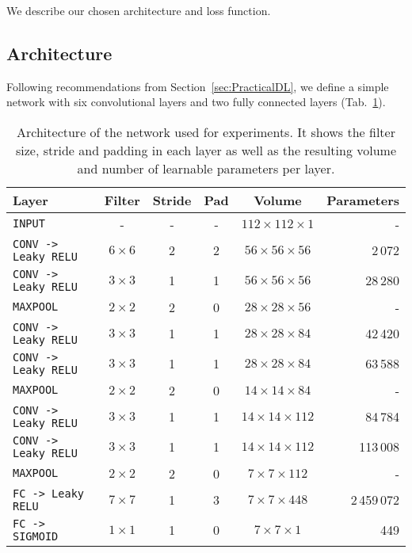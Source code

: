 We describe our chosen architecture and loss function.

\subsection{Architecture}
Following recommendations from Section~\ref{sec:PracticalDL}, we define a simple network with six convolutional layers and two fully connected layers (Tab.~\ref{tab:convNetArchitecture}).
\begin{table}[h]
	\centering
	\begin{tabular}{lccccr}
	\hline
	\textbf{Layer} & \textbf{Filter} & \textbf{Stride} &\textbf{Pad} & \textbf{Volume} & \textbf{Parameters} \\
	\hline
	\texttt{INPUT}	& -	& - & - & $112 \times 112 \times 1$ & -\\
	\texttt{CONV -> Leaky RELU} & $6 \times 6$ & 2 & 2 & $56 \times 56 \times 56$ & 2\,072\\
	\texttt{CONV -> Leaky RELU} & $3 \times 3$ & 1 & 1 & $56 \times 56 \times 56$ & 28\,280\\
	\texttt{MAXPOOL} & $2 \times 2$ & 2 & 0 & $28 \times 28 \times 56$ & -\\
	\texttt{CONV -> Leaky RELU} & $3 \times 3$ & 1 & 1 & $28 \times 28 \times 84$ & 42\,420\\
	\texttt{CONV -> Leaky RELU} & $3 \times 3$ & 1 & 1 & $28 \times 28 \times 84$ & 63\,588\\
	\texttt{MAXPOOL} & $2 \times 2$ & 2 & 0 & $14 \times 14 \times 84$ & -\\
	\texttt{CONV -> Leaky RELU} & $3 \times 3$ & 1 & 1 & $14 \times 14 \times 112$ & 84\,784\\
	\texttt{CONV -> Leaky RELU} & $3 \times 3$ & 1 & 1 & $14 \times 14 \times 112$ & 113\,008\\
	\texttt{MAXPOOL} & $2 \times 2$ & 2 & 0 & $7 \times 7 \times 112$ & -\\
	\texttt{FC -> Leaky RELU} & $7 \times 7$ & 1 & 3 & $7 \times 7 \times 448$ & 2\,459\,072\\
	\texttt{FC -> SIGMOID} & $1 \times 1$ & 1 & 0 & $7 \times 7 \times 1$ & 449 \\
	\hline
	\end{tabular}
	\caption[Selected convolutional network architecture]{Architecture of the network used for experiments. It shows the filter size, stride and padding in each layer as well as the resulting volume and number of learnable parameters per layer.}
	\label{tab:convNetArchitecture}
\end{table}


